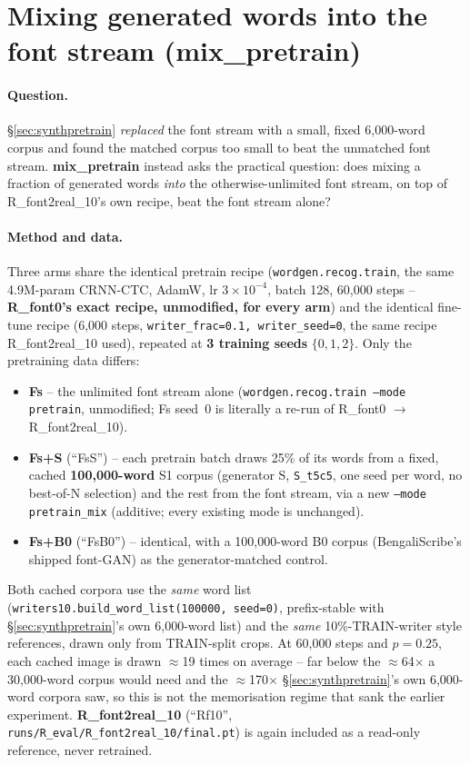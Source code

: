 \documentclass[10.5pt,a4paper]{article}
\newcommand{\fp}[1]{\nolinkurl{#1}}
\begin{document}
\section{Mixing generated words into the font stream (mix\_pretrain)}
\label{sec:mixpretrain}

\paragraph{Question.} \S\ref{sec:synthpretrain} \emph{replaced} the font stream with a small, fixed 6,000-word corpus and
found the matched corpus too small to beat the unmatched font stream. \textbf{mix\_pretrain} instead asks the practical
question: does mixing a fraction of generated words \emph{into} the otherwise-unlimited font stream, on top of
R\_font2real\_10's own recipe, beat the font stream alone?

\paragraph{Method and data.} Three arms share the identical pretrain recipe (\texttt{wordgen.recog.train}, the same 4.9M-param
CRNN-CTC, AdamW, lr $3\times10^{-4}$, batch 128, 60,000 steps -- \textbf{R\_font0's exact recipe, unmodified, for every arm}) and
the identical fine-tune recipe (6,000 steps, \texttt{writer\_frac=0.1, writer\_seed=0}, the same recipe
R\_font2real\_10 used), repeated at \textbf{3 training seeds} $\{0,1,2\}$. Only the pretraining data differs:
\begin{itemize}
\item \textbf{Fs} -- the unlimited font stream alone (\texttt{wordgen.recog.train --mode pretrain}, unmodified; Fs seed~0
  is literally a re-run of R\_font0 $\to$ R\_font2real\_10).
\item \textbf{Fs+S} (``FsS'') -- each pretrain batch draws 25\% of its words from a fixed, cached \textbf{100,000-word} S1
  corpus (generator S, \texttt{S\_t5c5}, one seed per word, no best-of-N selection) and the rest from the font stream, via a
  new \texttt{--mode pretrain\_mix} (additive; every existing mode is unchanged).
\item \textbf{Fs+B0} (``FsB0'') -- identical, with a 100,000-word B0 corpus (BengaliScribe's shipped font-GAN) as the
  generator-matched control.
\end{itemize}
Both cached corpora use the \emph{same} word list (\texttt{writers10.build\_word\_list(100000, seed=0)}, prefix-stable with
\S\ref{sec:synthpretrain}'s own 6,000-word list) and the \emph{same} 10\%-TRAIN-writer style references, drawn only from
TRAIN-split crops. At 60,000 steps and $p=0.25$, each cached image is drawn $\approx$19 times on average -- far below the
$\approx$64$\times$ a 30,000-word corpus would need and the $\approx$170$\times$ \S\ref{sec:synthpretrain}'s own 6,000-word
corpora saw, so this is not the memorisation regime that sank the earlier experiment. \textbf{R\_font2real\_10} (``Rf10'',
\fp{runs/R_eval/R_font2real_10/final.pt}) is again included as a read-only reference, never retrained.
\end{document}
